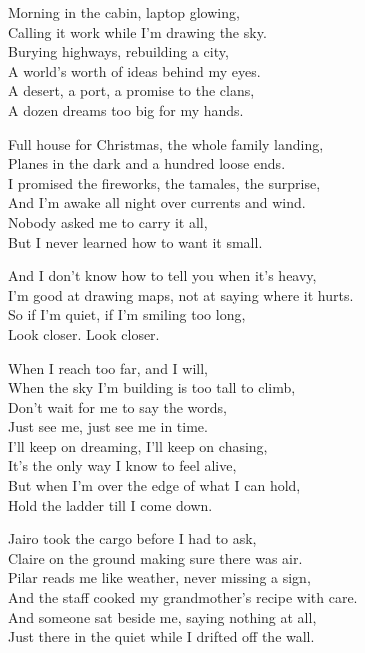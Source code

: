 \begin{lyrics}
Morning in the cabin, laptop glowing,\\
Calling it work while I’m drawing the sky.\\
Burying highways, rebuilding a city,\\
A world’s worth of ideas behind my eyes.\\
A desert, a port, a promise to the clans,\\
A dozen dreams too big for my hands.

Full house for Christmas, the whole family landing,\\
Planes in the dark and a hundred loose ends.\\
I promised the fireworks, the tamales, the surprise,\\
And I’m awake all night over currents and wind.\\
Nobody asked me to carry it all,\\
But I never learned how to want it small.

And I don’t know how to tell you when it’s heavy,\\
I’m good at drawing maps, not at saying where it hurts.\\
So if I’m quiet, if I’m smiling too long,\\
Look closer. Look closer.

When I reach too far, and I will,\\
When the sky I’m building is too tall to climb,\\
Don’t wait for me to say the words,\\
Just see me, just see me in time.\\
I’ll keep on dreaming, I’ll keep on chasing,\\
It’s the only way I know to feel alive,\\
But when I’m over the edge of what I can hold,\\
Hold the ladder till I come down.

Jairo took the cargo before I had to ask,\\
Claire on the ground making sure there was air.\\
Pilar reads me like weather, never missing a sign,\\
And the staff cooked my grandmother’s recipe with care.\\
And someone sat beside me, saying nothing at all,\\
Just there in the quiet while I drifted off the wall.


\end{lyrics}
